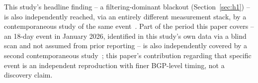 This study's headline finding -- a filtering-dominant blackout
(Section~\ref{sec:h1}) -- is also independently reached, via an entirely
different measurement stack, by a contemporaneous study of the same
event~\citep{jahromi2026multiperspective}. Part of the period this paper
covers -- an 18-day event in January 2026, identified in this study's own
data via a blind scan and not assumed from prior reporting -- is also
independently covered by a second
contemporaneous study~\citep{aceto2026iran}; this paper's contribution
regarding that specific event is an independent reproduction with finer
BGP-level timing, not a discovery claim.
